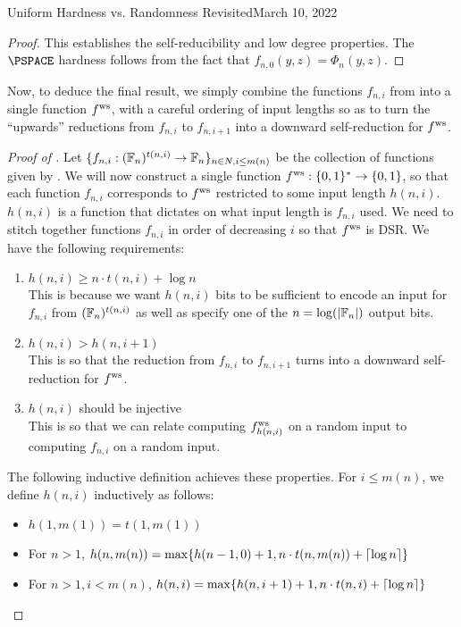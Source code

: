 \begin{lecture}{8}{Uniform Hardness vs. Randomness Revisited}{March 10, 2022}
\begin{proof}
This establishes the self-reducibility and low degree properties. The $\PSPACE$ hardness follows from the fact that $f_{n,0}(y, z) = \Phi_n(y, z)$. 
\end{proof}

Now, to deduce the final result, we simply combine the functions $f_{n,i}$ from  into a single function $ f^{\text{ws}} $, with a careful ordering of input lengths so as to turn the ``upwards'' reductions from $f_{n,i}$ to $f_{n,i+1}$ into a downward self-reduction for $ f^{\text{ws}} $.


\begin{proof}[Proof of  ]
	Let $\{f_{n,i} : (\mathbb{F}_n)^{t(n,i)} \rightarrow \mathbb{F}_n\}_{n \in N,i \leq m(n)}$ be the collection of functions given by . We will now construct a single function $ f^{\text{ws}}  : \{0, 1\}^* \rightarrow \{0, 1\}$, so that each function $f_{n,i}$ corresponds to $ f^{\text{ws}} $ restricted to some input length $h(n, i)$. $h(n,i)$ is a function that dictates on what input length is $f_{n,i}$ used.
	We need to stitch together functions $f_{n,i}$ in order of decreasing $i$ so that $ f^{\text{ws}} $ is DSR. We have the following requirements:
	\begin{enumerate}
		\item $h(n, i) \geq n \cdot t(n, i) + \log n$ \\
		This is because we want $h(n, i)$ bits to be sufficient to encode an input for $f_{n,i}$ from $(\mathbb{F}_n)^{t(n,i)}$ as well as specify one of the $n = \log (\lvert\mathbb{F}_n\rvert)$ output bits.
		\item $h(n, i) > h(n, i + 1)$ \\
		This is so that the reduction from $f_{n,i}$ to $f_{n,i+1}$ turns into a downward self-reduction for $ f^{\text{ws}} $.
		\item $h(n,i)$ should be injective \\
		This is so that we can relate computing $ f^{\text{ws}} _{h(n,i)}$ on a random input to computing $f_{n,i}$ on a random input. 
	\end{enumerate}
	The following inductive definition achieves these properties. For $i \leq m(n)$, we define $h(n, i)$ inductively as follows:
	\begin{itemize}
		\item $h(1, m(1)) = t(1, m(1))$
		\item For $n > 1$, $h(n, m(n)) = \max \{h(n - 1, 0) + 1, n \cdot t(n, m(n)) + \lceil\log n\rceil\}$
		\item For $n > 1, i < m(n)$, $h(n, i) = \max \{h(n, i + 1) + 1, n \cdot t(n, i) + \lceil\log n\rceil \}$

\end{itemize}
\end{proof}
\end{lecture}

